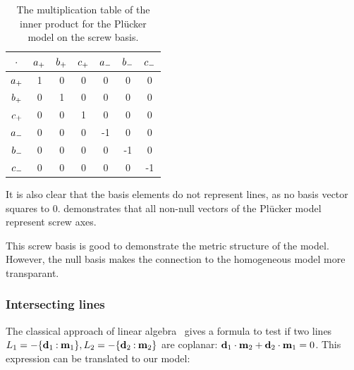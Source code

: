 \begin{table}[t]
  \caption{The multiplication table of the inner product for the Pl\"ucker model on the screw basis.}
  \label{tab:screwmetric}
  \begin{center}
    \begin{tabular}{|c||c|c|c|c|c|c|}
      \hline
      $\mathbin{\cdot}$ & $a_{+}$ & $b_{+}$ & $c_{+}$ & $a_{-}$ & $b_{-}$ & $c_{-}$ \\
      \hline \hline
      $a_{+}$ & 1 & 0 & 0 & 0 & 0 & 0 \\
      \hline
      $b_{+}$ & 0 & 1 & 0 & 0 & 0 & 0 \\
      \hline
      $c_{+}$ & 0 & 0 & 1 & 0 & 0 & 0 \\
      \hline
      $a_{-}$ & 0 & 0 & 0 & -1 & 0 & 0 \\
      \hline
      $b_{-}$ & 0 & 0 & 0 & 0 & -1 & 0 \\
      \hline
      $c_{-}$ & 0 & 0 & 0 & 0 & 0 & -1 \\
      \hline
    \end{tabular}
  \end{center}
\end{table}

It is also clear that the basis elements do not represent lines, as no basis vector squares to $0$.   demonstrates that all non-null vectors of the Pl\"ucker model represent screw axes.  

This screw basis is good to demonstrate the metric structure of the model.  However, the null basis makes the connection to the homogeneous model more transparant.  

\subsubsection{Intersecting lines}
The classical approach of linear algebra~\cite{Shoemake} gives a formula to test if two lines $L_1 = -\{\mathbf{d}_1 \mathbin{:} \mathbf{m}_1\}, L_2 = -\{\mathbf{d}_2 \mathbin{:} \mathbf{m}_2\}$ are coplanar: $\mathbf{d}_1 \mathbin{\cdot} \mathbf{m}_2 + \mathbf{d}_2 \mathbin{\cdot} \mathbf{m}_1 = 0$.  This expression can be translated to our model:

